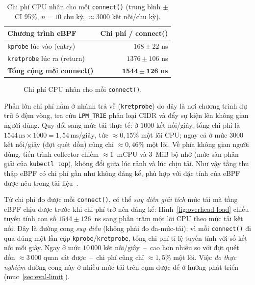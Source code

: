 \begin{table}[H]
  \centering
  \caption{Chi phí CPU nhân cho mỗi \texttt{connect()} (trung bình $\pm$ CI 95\%,
           $n = 10$ chu kỳ, $\approx$3000 kết nối/chu kỳ).}
  \label{tab:eval-overhead}
  \small
  \begin{tabular}{@{}l r@{}}
    \toprule
    \textbf{Chương trình eBPF} & \textbf{Chi phí / connect()} \\
    \midrule
    \texttt{kprobe} lúc vào (entry)        & $168 \pm 22$ ns \\
    \texttt{kretprobe} lúc ra (return)     & $1376 \pm 106$ ns \\
    \textbf{Tổng cộng mỗi connect()}       & $\mathbf{1544 \pm 126}$ \textbf{ns} \\
    \bottomrule
  \end{tabular}
\end{table}

\begin{figure}[H]
  \centering
  \resizebox{0.85\linewidth}{!}{}
  \caption{Chi phí CPU nhân cho mỗi \texttt{connect()}.}
  \label{fig:overhead-ebpf}
\end{figure}

Phần lớn chi phí nằm ở nhánh trả về (\texttt{kretprobe}) do đây là nơi chương
trình dự trữ ô đệm vòng, tra cứu \texttt{LPM\_TRIE} phân loại CIDR và đẩy sự kiện
lên không gian người dùng. Quy đổi sang mức tải thực tế: ở $1000$ kết nối/giây,
tổng chi phí là $1544\,\text{ns} \times 1000 = 1{,}54\,\text{ms/giây}$, tức
$\approx 0{,}15\%$ một lõi CPU; ngay cả ở mức $3000$ kết nối/giây (đợt quét dồn)
cũng chỉ $\approx 0{,}46\%$ một lõi. Về phía không gian người dùng, tiến trình
collector chiếm $\approx 1$~mCPU và $3$~MiB bộ nhớ (mức sàn phân giải của
\texttt{kubectl top}), không đổi giữa lúc rảnh và lúc chịu tải. Như vậy tầng thu
thập eBPF có chi phí gần như không đáng kể, phù hợp với đặc tính của eBPF được
nêu trong tài liệu~\cite{gregg2019bpf}.

Từ chi phí đo được mỗi \texttt{connect()}, có thể \emph{suy diễn giải tích} mức tải mà
tầng eBPF chịu được trước khi chi phí trở nên đáng kể: Hình~\ref{fig:overhead-load}
chiếu tuyến tính con số $1544 \pm 126$~ns sang phần trăm một lõi CPU theo mức tải kết
nối. Đây là đường cong \emph{suy diễn} (không phải đo đa-mức-tải): vì mỗi
\texttt{connect()} đi qua đúng một lần cặp \texttt{kprobe}/\texttt{kretprobe}, tổng chi
phí tỉ lệ tuyến tính với số kết nối mỗi giây. Ngay ở mức $10\,000$ kết nối/giây~--~cao
hơn nhiều so với đợt quét dồn $\approx 3\,000$ quan sát được~--~chi phí cũng chỉ
$\approx 1{,}5\%$ một lõi. Việc \emph{đo thực nghiệm} đường cong này ở nhiều mức tải
trên cụm được để ở hướng phát triển (mục~\ref{sec:eval-limit}).

